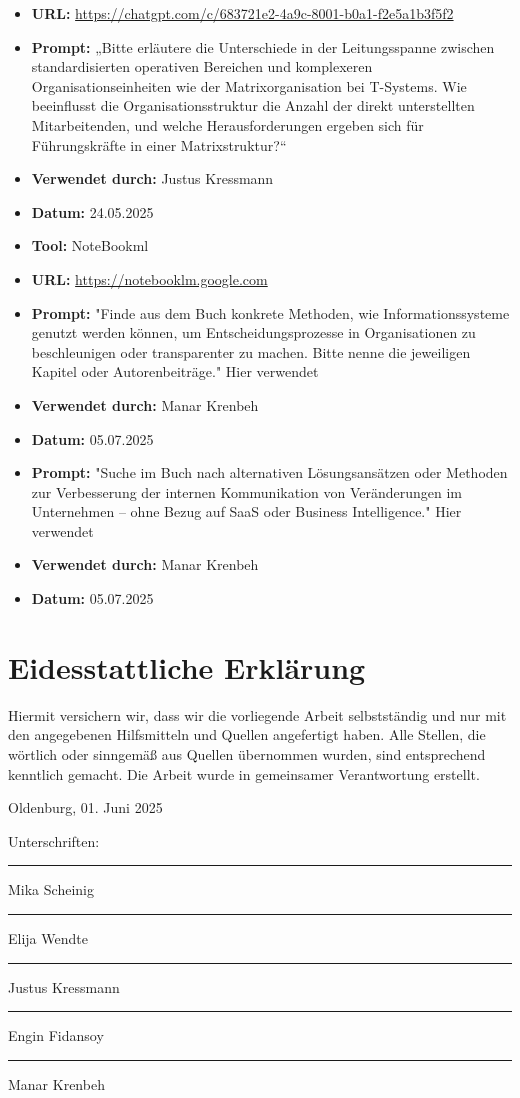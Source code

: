 \documentclass[12pt,a4paper]{article}
\begin{document}
	\begin{itemize}
		\item \textbf{URL:} \url{https://chatgpt.com/c/683721e2-4a9c-8001-b0a1-f2e5a1b3f5f2}
		\item \textbf{Prompt:} „Bitte erläutere die Unterschiede in der Leitungsspanne zwischen standardisierten operativen Bereichen und komplexeren Organisationseinheiten wie der Matrixorganisation bei T-Systems. Wie beeinflusst die Organisationsstruktur die Anzahl der direkt unterstellten Mitarbeitenden, und welche Herausforderungen ergeben sich für Führungskräfte in einer Matrixstruktur?“
		\item \textbf{Verwendet durch:} Justus Kressmann
		\item \textbf{Datum:} 24.05.2025
		\item \textbf{Tool:} NoteBookml
		\item \textbf{URL:} \url{https://notebooklm.google.com}
		\item \textbf{Prompt:} "Finde aus dem Buch konkrete Methoden, wie Informationssysteme genutzt werden können, um Entscheidungsprozesse in Organisationen zu beschleunigen oder transparenter zu machen. Bitte nenne die jeweiligen Kapitel oder Autorenbeiträge." Hier \parencite{StelzerDirk1962-2011I:GA} verwendet
		\item \textbf{Verwendet durch:} Manar Krenbeh
		\item \textbf{Datum:} 05.07.2025
		\item \textbf{Prompt:} "Suche im Buch nach alternativen Lösungsansätzen oder Methoden zur Verbesserung der internen Kommunikation von Veränderungen im Unternehmen – ohne Bezug auf SaaS oder Business Intelligence." Hier \parencite{kumkale_organizational_2022} verwendet
		\item \textbf{Verwendet durch:} Manar Krenbeh
		\item \textbf{Datum:} 05.07.2025
	\end{itemize}
	
	\newpage
	\section*{Eidesstattliche Erklärung}
	Hiermit versichern wir, dass wir die vorliegende Arbeit selbstständig und nur mit den angegebenen Hilfsmitteln und Quellen angefertigt haben. Alle Stellen, die wörtlich oder sinngemäß aus Quellen übernommen wurden, sind entsprechend kenntlich gemacht. Die Arbeit wurde in gemeinsamer Verantwortung erstellt.
	
	\vspace{2cm}
	Oldenburg, 01. Juni 2025
	
	Unterschriften: \\
	\rule{5cm}{0.4pt} Mika Scheinig \\
	\rule{5cm}{0.4pt} Elija Wendte \\
	\rule{5cm}{0.4pt} Justus Kressmann \\
	\rule{5cm}{0.4pt} Engin Fidansoy \\
	\rule{5cm}{0.4pt} Manar Krenbeh
	
\end{document}
